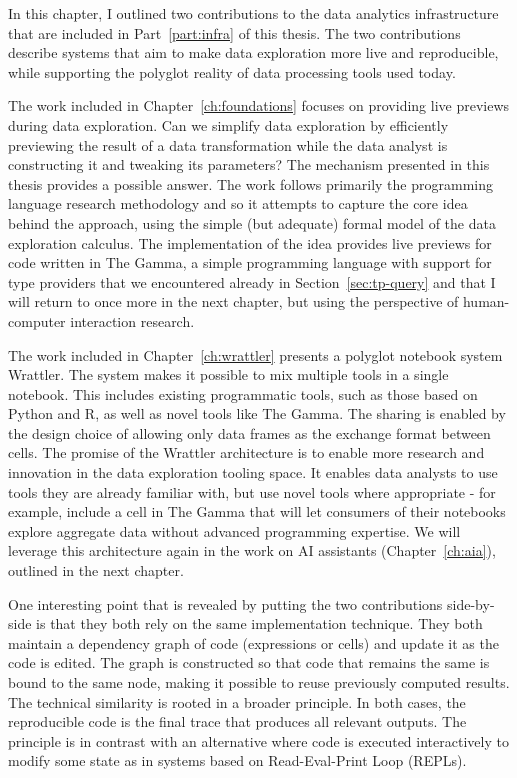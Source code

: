 \documentclass[fleqn,11pt]{report}
\theoremstyle{definition}
\begin{document}
\noindent
In this chapter, I outlined two contributions to the data analytics infrastructure that
are included in Part~\ref{part:infra} of this thesis. The two contributions describe systems
that aim to make data exploration more live and reproducible, while supporting the polyglot
reality of data processing tools used today.

The work included in Chapter~\ref{ch:foundations} focuses on providing live previews during
data exploration. Can we simplify data exploration by efficiently previewing the result of
a data transformation while the data analyst is constructing it and tweaking its parameters?
The mechanism presented in this thesis provides a possible answer. The work follows primarily
the programming language research methodology and so it attempts to capture the core idea
behind the approach, using the simple (but adequate) formal model of the data exploration calculus.
The implementation of the idea provides live previews for code written in The Gamma, a simple
programming language with support for type providers that we encountered already in
Section~\ref{sec:tp-query} and that I will return to once more in the next chapter, but using
the perspective of human-computer interaction research.

The work included in Chapter~\ref{ch:wrattler} presents a polyglot notebook system Wrattler.
The system makes it possible to mix multiple tools in a single notebook. This includes
existing programmatic tools, such as those based on Python and R, as well as novel tools like
The Gamma. The sharing is enabled by the design choice of allowing only data frames as the
exchange format between cells. The promise of the Wrattler architecture is to enable more research
and innovation in the data exploration tooling space. It enables data analysts to use tools they
are already familiar with, but use novel tools where appropriate - for example, include a cell in
The Gamma that will let consumers of their notebooks explore aggregate data without advanced
programming expertise. We will leverage this architecture again in the work on AI assistants
(Chapter~\ref{ch:aia}), outlined in the next chapter.

One interesting point that is revealed by putting the two contributions side-by-side is that they
both rely on the same implementation technique. They both maintain a dependency graph of
code (expressions or cells) and update it as the code is edited. The graph is constructed so that
code that remains the same is bound to the same node, making it possible to reuse previously
computed results. The technical similarity is rooted in a broader principle. In both cases,
the reproducible code is the final trace that produces all relevant outputs. The principle is
in contrast with an alternative where code is executed interactively to modify some state
as in systems based on Read-Eval-Print Loop (REPLs).
\end{document}
